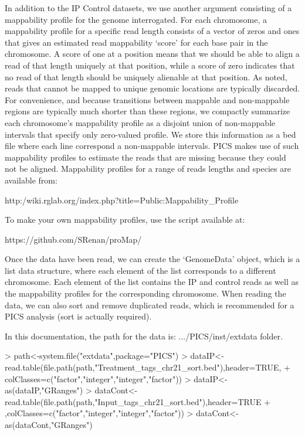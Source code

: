 \documentclass[a4paper]{article}
\begin{document}
In addition to the IP Control datasets, we use another argument consisting of a mappability profile for the genome interrogated. For each chromosome, a mappability profile for a specific read length consists of a vector of zeros and ones that gives an estimated read mappability `score' for each base pair in the chromosome. A score of one at a position means that we should be able to align a read of that length uniquely at that position, while a score of zero indicates that no read of that length should be uniquely alienable at that position. As noted, reads that cannot be mapped to unique genomic locations are typically discarded. For convenience, and because transitions between mappable and non-mappable regions are typically much shorter than these regions, we compactly summarize each chromosome's mappability profile as a disjoint union of non-mappable intervals that specify only zero-valued profile. We store this information as a bed file where each line correspond a non-mappable intervals. PICS makes use of such mappability profiles to estimate the reads that are missing because they could not be aligned. Mappability profiles for a range of reads lengths and species are available from:

http:/wiki.rglab.org/index.php?title=Public:Mappability_Profile

To make your own mappability profiles, use the script available at:

https://github.com/SRenan/proMap/

Once the data have been read, we can create the `GenomeData' object, which is a list data structure, where each element of the list corresponds to a different chromosome. Each element of the list contains the IP and control reads as well as the mappability profiles for the corresponding chromosome. When reading the data, we can also sort and remove duplicated reads, which is recommended for a PICS analysis (sort is actually required).


In this documentation, the path for the data is:  .../PICS/inst/extdata folder.
\begin{Schunk}
\begin{Sinput}
> path<-system.file("extdata",package="PICS")
> dataIP<-read.table(file.path(path,"Treatment_tags_chr21_sort.bed"),header=TRUE,
+ colClasses=c("factor","integer","integer","factor"))
> dataIP<-as(dataIP,"GRanges")
> dataCont<-read.table(file.path(path,"Input_tags_chr21_sort.bed"),header=TRUE
+ ,colClasses=c("factor","integer","integer","factor"))
> dataCont<-as(dataCont,"GRanges")
\end{Sinput}
\end{Schunk}
\end{document}
